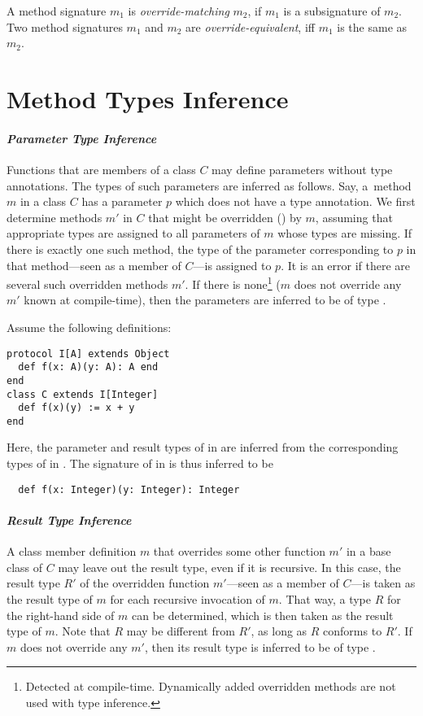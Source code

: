 A method signature $m_1$ is {\em override-matching} $m_2$, if $m_1$ is a subsignature of $m_2$. Two method signatures $m_1$ and $m_2$ are {\em override-equivalent}, iff $m_1$ is the same as $m_2$. 






\section{Method Types Inference}
\label{sec:method-types-inference}

\paragraph{\em Parameter Type Inference}
Functions that are members of a class $C$ may define parameters without type annotations. The types of such parameters are inferred as follows. Say, a~method $m$ in a class $C$ has a parameter $p$ which does not have a type annotation. We first determine methods $m'$ in $C$ that might be overridden () by $m$, assuming that appropriate types are assigned to all parameters of $m$ whose types are missing. If there is exactly one such method, the type of the parameter corresponding to $p$ in that method---seen as a member of $C$---is assigned to $p$. It is an error if there are several such overridden methods $m'$. If there is none\footnote{Detected at compile-time. Dynamically added overridden methods are not used with type inference.} ($m$ does not override any $m'$ known at compile-time), then the parameters are inferred to be of type .

\example Assume the following definitions:
\begin{lstlisting}
protocol I[A] extends Object
  def f(x: A)(y: A): A end
end
class C extends I[Integer]
  def f(x)(y) := x + y
end
\end{lstlisting}
Here, the parameter and result types of \lstinline@f@ in \lstinline@C@ are inferred from the corresponding types of \lstinline@f@ in \lstinline@I@. The signature of \lstinline@f@ in \lstinline@C@ is thus inferred to be
\begin{lstlisting}
  def f(x: Integer)(y: Integer): Integer
\end{lstlisting}

\paragraph{\em Result Type Inference}
A class member definition $m$ that overrides some other function $m'$ in a base class of $C$ may leave out the result type, even if it is recursive. In this case, the result type $R'$ of the overridden function $m'$---seen as a member of $C$---is taken as the result type of $m$ for each recursive invocation of $m$. That way, a type $R$ for the right-hand side of $m$ can be determined, which is then taken as the result type of $m$. Note that $R$ may be different from $R'$, as long as $R$ conforms to $R'$. If $m$ does not override any $m'$, then its result type is inferred to be of type . 

